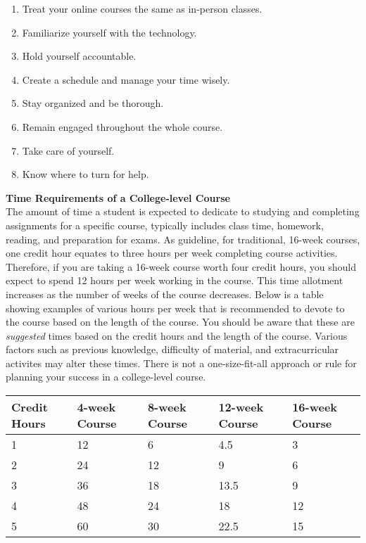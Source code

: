\documentclass[11pt]{article}
\renewenvironment{framed}[1][]{%
  \def\FrameCommand{%
    \hspace{1pt}%
    {\color{mybordercolor}\vrule width 2pt} %
    \hspace{1pt}%
    \fboxsep=\FrameSep%
    \colorbox{mybgcolor}%
  }%
  \MakeFramed {\advance\hsize-\width \FrameRestore}%
}{%
  \endMakeFramed
}
\begin{document}
\begin{enumerate}
\item Treat your online courses the same as in-person classes.
\item Familiarize yourself with the technology.
\item Hold yourself accountable.
\item Create a schedule and manage your time wisely.
\item Stay organized and be thorough.
\item Remain engaged throughout the whole course.
\item Take care of yourself.
\item Know where to turn for help.
\end{enumerate}

\begin{framed}
\textbf{Time Requirements of a College-level Course}\\
The amount of time a student is expected to dedicate to studying and completing assignments for a specific course, typically includes class time, homework, reading, and preparation for exams. As guideline, for traditional, 16-week courses, one credit hour equates to three hours per week completing course activities. Therefore, if you are taking a 16-week course worth four credit hours, you should expect to spend 12 hours per week working in the course. This time allotment increases as the number of weeks of the course decreases. Below is a table showing examples of various hours per week that is recommended to devote to the course based on the length of the course. You should be aware that these are \textit{suggested} times based on the credit hours and the length of the course. Various factors such as previous knowledge, difficulty of material, and extracurricular activites may alter these times. There is not a one-size-fit-all approach or rule for planning your success in a college-level course.

\bigskip\noindent
\begin{tabular}{p{}p{}p{}p{}p{}}
\toprule
Credit Hours & 4-week Course & 8-week Course & 12-week Course & 16-week Course \\
\hline
1 & 12 & 6 & 4.5 & 3 \\
2 & 24 & 12 & 9 & 6 \\
3 & 36 & 18 & 13.5 & 9 \\
4 & 48 & 24 & 18 & 12 \\
5 & 60 & 30 & 22.5 & 15 \\
\bottomrule
\end{tabular}

\bigskip
\end{framed}
\end{document}
